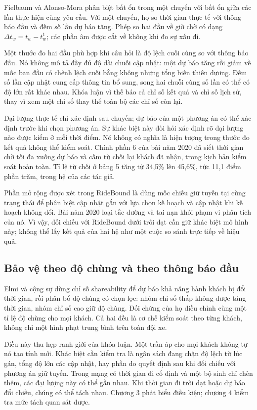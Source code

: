 Fielbaum và Alonso-Mora \cite{fielbaum2020} phân biệt bất ổn trong một chuyến với
bất ổn giữa các lần thực hiện cùng yêu cầu. Với một chuyến, họ so thời gian thực tế với
thông báo đầu và đếm số lần dự báo tăng. Phép so hai đầu về giờ chờ có dạng
$\Delta t_w=t_w-t_w^1$; các phần âm được cắt về không khi đo sự xấu đi.

Một thước đo hai đầu phù hợp khi câu hỏi là độ lệch cuối cùng so với thông báo đầu.
Nó không mô tả đầy đủ độ dài chuỗi cập nhật: một dự báo tăng rồi giảm về mốc ban đầu
có chênh lệch cuối bằng không nhưng tổng biến thiên dương. Đếm số lần cập nhật cung
cấp thông tin bổ sung, song hai chuỗi cùng số lần có thể có độ lớn rất khác nhau.
Khóa luận vì thế báo cả chỉ số kết quả và chỉ số lịch sử, thay vì xem một chỉ số thay
thế toàn bộ các chỉ số còn lại.

Đại lượng thực tế chỉ xác định sau chuyến; dự báo của một phương án có thể xác định
trước khi chọn phương án. Sự khác biệt này đòi hỏi xác định rõ đại lượng nào được
kiểm ở mỗi thời điểm. Nó không có nghĩa là hiện tượng trong thước đo kết quả không
thể kiểm soát. Chính phần 6 của bài năm 2020 đã siết thời gian chờ tối đa xuống dự báo
và cấm từ chối lại khách đã nhận, trong kịch bản kiểm soát hoàn toàn. Tỉ lệ từ chối ở
bảng 5 tăng từ 34,5\% lên 45,6\%, tức 11,1 điểm phần trăm, trong hệ của các tác giả.

Phần mở rộng được xét trong RideBound là dùng mốc chiếu giữ tuyến tại cùng trạng thái
để phân biệt cập nhật gắn với lựa chọn kế hoạch và cập nhật khi kế hoạch không đổi.
Bài năm 2020 loại tắc đường và tai nạn khỏi phạm vi phân tích của nó. Vì vậy, đối
chiếu với RideBound dưới trôi dạt cần giữ khác biệt mô hình này; không thể lấy kết
quả của hai hệ như một cuộc so sánh trực tiếp về hiệu quả.

\subsection{Bảo vệ theo độ chùng và theo thông báo đầu}

Elmi và cộng sự \cite{elmi2026} dùng chỉ số shareability để dự báo khả năng hành khách
bị đổi thời gian, rồi phân bổ độ chùng có chọn lọc: nhóm chỉ số thấp không được tăng
thời gian, nhóm chỉ số cao giữ độ chùng. Đối chứng của họ điều chỉnh cùng một tỉ lệ độ
chùng cho mọi khách. Cả hai đều là cơ chế kiểm soát theo từng khách, không chỉ một
hình phạt trung bình trên toàn đội xe.

Điều này thu hẹp ranh giới của khóa luận. Một trần áp cho mọi khách không tự nó tạo
tính mới. Khác biệt cần kiểm tra là ngân sách đang chặn độ lệch từ lúc gán, tổng độ
lớn các cập nhật, hay phần do quyết định sau khi đối chiếu với phương án giữ tuyến.
Trong mạng có thời gian đi cố định và một bộ sinh chỉ chèn thêm, các đại lượng này
có thể gần nhau. Khi thời gian đi trôi dạt hoặc dự báo đổi chiều, chúng có thể tách
nhau. Chương 3 phát biểu điều kiện; chương 4 kiểm tra mức tách quan sát được.

